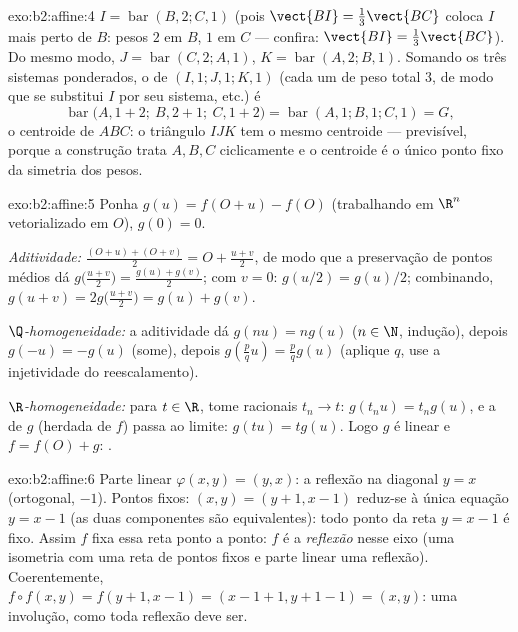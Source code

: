 \begin{solution}{exo:b2:affine:4}
$I = \operatorname{bar}(B, 2; C, 1)$ (pois $\vect{BI} =
\frac13\vect{BC}$ coloca $I$ mais perto de $B$: pesos $2$ em $B$,
$1$ em $C$ --- confira: $\vect{BI} = \frac{1}{3}\vect{BC}$).
Do mesmo modo, $J = \operatorname{bar}(C, 2; A, 1)$, $K =
\operatorname{bar}(A, 2; B, 1)$. Somando os três sistemas
ponderados, o  de $(I, 1; J, 1; K, 1)$ (cada um de peso
total $3$, de modo que se substitui $I$ por seu sistema, etc.) é
\[
\operatorname{bar}\bigl(A, 1 + 2;\ B, 2 + 1;\ C, 1 + 2\bigr)
= \operatorname{bar}(A, 1; B, 1; C, 1) = G ,
\]
o centroide de $ABC$: o triângulo $IJK$ tem o mesmo centroide ---
previsível, porque a construção trata $A, B, C$ ciclicamente
e o centroide é o único ponto fixo da simetria 
dos pesos.
\end{solution}

\begin{solution}{exo:b2:affine:5}
Ponha $g(u) = f(O + u) - f(O)$ (trabalhando em $\R^n$ vetorializado em
$O$), $g(0) = 0$.

\emph{Aditividade:} $\frac{(O + u) + (O + v)}{2} = O + \frac{u +
v}{2}$, de modo que a preservação de pontos médios dá $g\bigl(\frac{u+v}{2}\bigr)
= \frac{g(u) + g(v)}{2}$; com $v = 0$: $g(u/2) = g(u)/2$;
combinando, $g(u + v) = 2g\bigl(\frac{u+v}{2}\bigr) = g(u) + g(v)$.

\emph{$\Q$-homogeneidade:} a aditividade dá $g(nu) = ng(u)$ ($n \in
\N$, indução), depois $g(-u) = -g(u)$ (some), depois $g(\frac pq u) =
\frac pq g(u)$ (aplique $q$, use a injetividade do reescalamento).

\emph{$\R$-homogeneidade:} para $t \in \R$, tome racionais $t_n \to
t$: $g(t_nu) = t_ng(u)$, e a  de $g$ (herdada de $f$)
passa ao limite: $g(tu) = tg(u)$. Logo $g$ é linear e $f =
f(O) + g$: .
\end{solution}

\begin{solution}{exo:b2:affine:6}
Parte linear $\varphi(x,y) = (y, x)$: a reflexão na diagonal
$y = x$ (ortogonal,  $-1$). Pontos fixos: $(x, y) = (y
+ 1, x - 1)$ reduz-se à única equação $y = x - 1$ (as duas
componentes são equivalentes): todo ponto da reta $y = x - 1$ é
fixo. Assim $f$ fixa essa reta ponto a ponto: $f$
é a \emph{reflexão} nesse eixo (uma isometria com uma reta de
pontos fixos e parte linear uma reflexão). Coerentemente, $f \circ
f(x,y) = f(y+1, x-1) = (x - 1 + 1, y + 1 - 1) = (x, y)$: uma
involução, como toda reflexão deve ser.
\end{solution}

